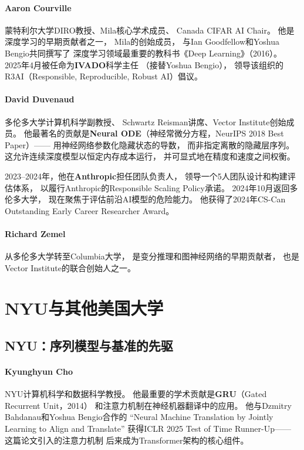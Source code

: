 \paragraph{Aaron Courville}
蒙特利尔大学DIRO教授、Mila核心学术成员、
Canada CIFAR AI Chair。
他是深度学习的早期贡献者之一，
Mila的创始成员，
与Ian Goodfellow和Yoshua Bengio共同撰写了
深度学习领域最重要的教科书《Deep Learning》（2016）。
2025年4月被任命为\textbf{IVADO}科学主任
（接替Yoshua Bengio），
领导该组织的R3AI（Responsible, Reproducible, Robust AI）倡议。

\paragraph{David Duvenaud}
多伦多大学计算机科学副教授、
Schwartz Reisman讲席、Vector Institute创始成员。
他最著名的贡献是\textbf{Neural ODE}（神经常微分方程，NeurIPS 2018 Best Paper）——
用神经网络参数化隐藏状态的导数，
而非指定离散的隐藏层序列。
这允许连续深度模型以恒定内存成本运行，
并可显式地在精度和速度之间权衡。

2023--2024年，他在\textbf{Anthropic}担任团队负责人，
领导一个5人团队设计和构建评估体系，
以履行Anthropic的Responsible Scaling Policy承诺。
2024年10月返回多伦多大学，
现在聚焦于评估前沿AI模型的危险能力。
他获得了2024年CS-Can Outstanding Early Career Researcher Award。

\paragraph{Richard Zemel}
从多伦多大学转至Columbia大学，
是变分推理和图神经网络的早期贡献者，
也是Vector Institute的联合创始人之一。


\section{NYU与其他美国大学}
\label{sec:nyu-others}

\subsection{NYU：序列模型与基准的先驱}

\paragraph{Kyunghyun Cho}
NYU计算机科学和数据科学教授。
他最重要的学术贡献是\textbf{GRU}（Gated Recurrent Unit，2014）
和注意力机制在神经机器翻译中的应用。
他与Dzmitry Bahdanau和Yoshua Bengio合作的
``Neural Machine Translation by Jointly Learning to Align and Translate''
获得ICLR 2025 Test of Time Runner-Up——
这篇论文引入的注意力机制
后来成为Transformer架构的核心组件。

